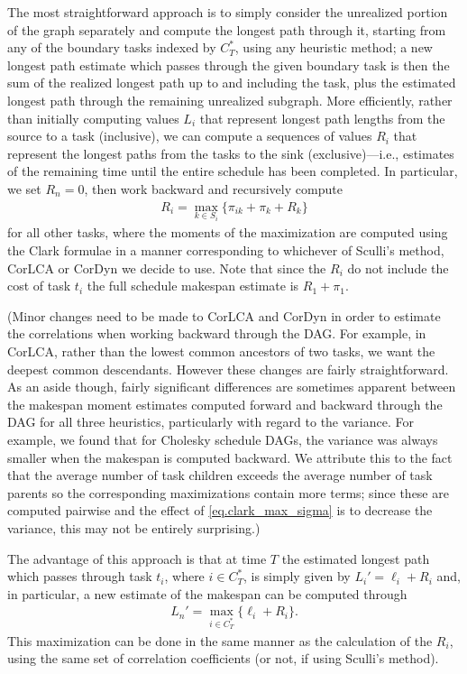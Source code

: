 \documentclass[12pt]{article}
\begin{document}
The most straightforward approach is to simply consider the unrealized portion of the graph separately and compute the longest path through it, starting from any of the boundary tasks indexed by $C_T^*$, using any heuristic method; a new longest path estimate which passes through the given boundary task is then the sum of the realized longest path up to and including the task, plus the estimated longest path through the remaining unrealized subgraph. More efficiently, rather than initially computing values $L_i$ that represent longest path lengths from the source to a task (inclusive), we can compute a sequences of values $R_i$ that represent the longest paths from the tasks to the sink (exclusive)---i.e., estimates of the remaining time until the entire schedule has been completed. In particular, we set $R_n = 0$, then work backward and recursively compute  
\begin{align*}
  R_i = \max_{k \in S_i} \{ \pi_{ik} + \pi_k + R_k  \}
\end{align*}
for all other tasks, where the moments of the maximization are computed using the Clark formulae in a manner corresponding to whichever of Sculli's method, CorLCA or CorDyn we decide to use. Note that since the $R_i$ do not include the cost of task $t_i$ the full schedule makespan estimate is $R_1 + \pi_1$.

(Minor changes need to be made to CorLCA and CorDyn in order to estimate the correlations when working backward through the DAG. For example, in CorLCA, rather than the lowest common ancestors of two tasks, we want the deepest common descendants. However these changes are fairly straightforward. As an aside though, fairly significant differences are sometimes apparent between the makespan moment estimates computed forward and backward through the DAG for all three heuristics, particularly with regard to the variance. For example, we found that for Cholesky schedule DAGs, the variance was always smaller when the makespan is computed backward. We attribute this to the fact that the average number of task children exceeds the average number of task parents so the corresponding maximizations contain more terms; since these are computed pairwise and the effect of \eqref{eq.clark_max_sigma} is to decrease the variance, this may not be entirely surprising.) 

The advantage of this approach is that at time $T$ the estimated longest path which passes through task $t_i$, where $i \in C_T^*$, is simply given by $L_i' = \ell_i + R_i$ and, in particular, a new estimate of the makespan can be computed through
\begin{align*}
  L_n' = \max_{i \in C_T^*} \{ \ell_i + R_i  \}.
  \end{align*}
This maximization can be done in the same manner as the calculation of the $R_i$, using the same set of correlation coefficients (or not, if using Sculli's method).
\end{document}
